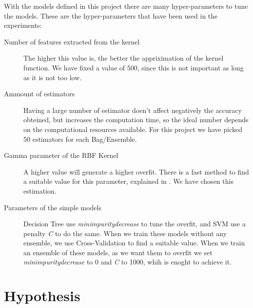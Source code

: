 \begin{pre-delivery}
  With the models defined in this project there are many hyper-parameters to
  tune the models. These are the hyper-parameters that have been used in the
  experiments:
  \begin{description}
    \item[Number of features extracted from the kernel] The higher this value
    is, the better the appriximation of the kernel function. We have fixed a
    value of 500, since this is not important as long as it is not too low.
    \item[Ammount of estimators] Having a large number of estimator doen't
    affect negatively the accuracy obteined, but increases the computation
    time, so the ideal number depends on the computational resources
    available. For this project we have picked 50 estimators for each Bag/Ensemble.
    \item[Gamma parameter of the RBF Kernel] A higher value will generate a
    higher overfit. There is a fast method to find a suitable value for this
    parameter, explained in
    \cite{caputo2002appearance}
    . We have chosen this estimation.
    \item[Parameters of the simple models] Decision Tree use
    \textit{min\tu impurity\tu decrease} to tune the overfit, and SVM use a
    penalty \textit{C} to do the same. When we train these models without
    any ensemble, we use Cross-Validation to find a suitable value. When we
    train an ensemble of these models, as we want them to overfit we set
    \textit{min\tu impurity\tu decrease} to 0 and \textit{C} to 1000, whih
    is enoght to achieve it.
  \end{description}
\end{pre-delivery}
\section{Hypothesis}




